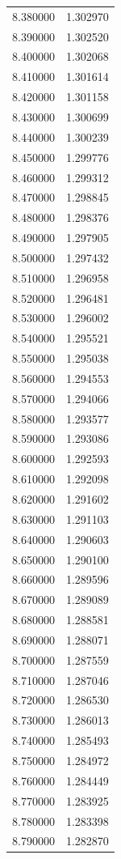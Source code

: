 \begin{tabular}{rr}
8.380000 & 1.302970 \\
8.390000 & 1.302520 \\
8.400000 & 1.302068 \\
8.410000 & 1.301614 \\
8.420000 & 1.301158 \\
8.430000 & 1.300699 \\
8.440000 & 1.300239 \\
8.450000 & 1.299776 \\
8.460000 & 1.299312 \\
8.470000 & 1.298845 \\
8.480000 & 1.298376 \\
8.490000 & 1.297905 \\
8.500000 & 1.297432 \\
8.510000 & 1.296958 \\
8.520000 & 1.296481 \\
8.530000 & 1.296002 \\
8.540000 & 1.295521 \\
8.550000 & 1.295038 \\
8.560000 & 1.294553 \\
8.570000 & 1.294066 \\
8.580000 & 1.293577 \\
8.590000 & 1.293086 \\
8.600000 & 1.292593 \\
8.610000 & 1.292098 \\
8.620000 & 1.291602 \\
8.630000 & 1.291103 \\
8.640000 & 1.290603 \\
8.650000 & 1.290100 \\
8.660000 & 1.289596 \\
8.670000 & 1.289089 \\
8.680000 & 1.288581 \\
8.690000 & 1.288071 \\
8.700000 & 1.287559 \\
8.710000 & 1.287046 \\
8.720000 & 1.286530 \\
8.730000 & 1.286013 \\
8.740000 & 1.285493 \\
8.750000 & 1.284972 \\
8.760000 & 1.284449 \\
8.770000 & 1.283925 \\
8.780000 & 1.283398 \\
8.790000 & 1.282870 \\

\end{tabular}
